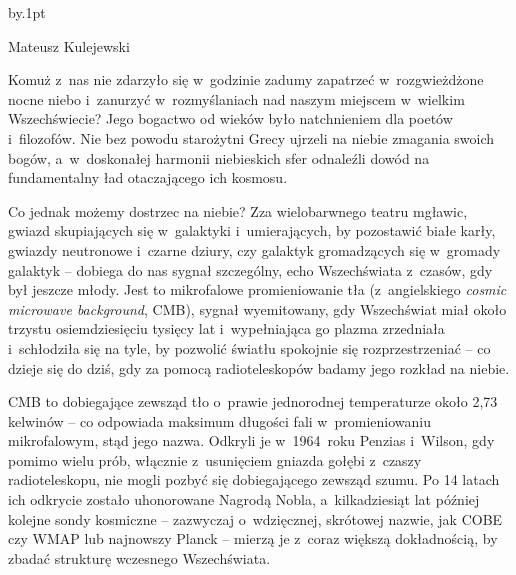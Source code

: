 \advance\baselineskip by.1pt

{Mateusz Kulejewski}



\vspace*{\parskip}
\begin{dwieszpalty}
Komuż z~nas nie zdarzyło się w~godzinie zadumy zapatrzeć w~rozgwieżdżone nocne niebo i~zanurzyć  w~rozmyślaniach nad naszym miejscem w~wielkim Wszechświecie? Jego bogactwo od wieków było natchnieniem dla poetów i~filozofów. Nie bez powodu starożytni Grecy ujrzeli na niebie zmagania swoich bogów, a~w~doskonałej harmonii niebieskich sfer odnaleźli dowód na fundamentalny ład otaczającego ich kosmosu.

Co jednak możemy dostrzec na niebie? Zza wielobarwnego teatru mgławic, gwiazd skupiających się w~galaktyki i~umierających, by pozostawić białe karły, gwiazdy neutronowe i~czarne dziury, czy galaktyk gromadzących się w~gromady galaktyk -- dobiega do nas sygnał szczególny, echo Wszechświata z~czasów, gdy był jeszcze młody. Jest to mikrofalowe promieniowanie tła (z~angielskiego \textit{cosmic microwave background}, CMB), sygnał wyemitowany, gdy Wszechświat miał około trzystu osiemdziesięciu tysięcy lat i~wypełniająca go plazma zrzedniała i~schłodziła się na tyle, by pozwolić światłu spokojnie się rozprzestrzeniać -- co dzieje się do dziś, gdy za pomocą radioteleskopów badamy jego rozkład na niebie.

CMB to dobiegające zewsząd tło o~prawie jednorodnej temperaturze około 2,73 kelwinów -- co odpowiada maksimum długości fali w~promieniowaniu mikrofalowym, stąd jego nazwa. Odkryli je w~1964~roku Penzias i~Wilson, gdy pomimo wielu prób, włącznie z~usunięciem gniazda gołębi %
z~czaszy radioteleskopu, nie mogli pozbyć się dobiegającego zewsząd szumu. Po 14 latach ich odkrycie zostało uhonorowane Nagrodą Nobla, a~kilkadziesiąt lat później kolejne sondy kosmiczne -- zazwyczaj o~wdzięcznej, skrótowej nazwie, jak COBE czy WMAP lub najnowszy Planck -- mierzą je z~coraz większą dokładnością, by zbadać strukturę wczesnego Wszechświata.


\end{dwieszpalty}
